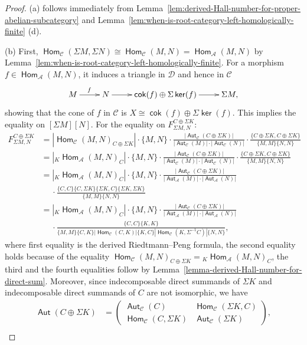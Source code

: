 \documentclass[reqno,12pt,a4paper]{amsart}
\theoremstyle{remark}
\theoremstyle{definition}
\newcommand{\opname}[1]{\operatorname{\mathsf{#1}}}
\newcommand{\cok}{\opname{cok}\nolimits}
\renewcommand{\ker}{\opname{ker}\nolimits}
\newcommand{\Hom}{\opname{Hom}}
\newcommand{\Aut}{\opname{Aut}}
\newcommand{\ca}{{\mathcal A}}
\newcommand{\cc}{{\mathcal C}}
\newcommand{\cd}{{\mathcal D}}
\numberwithin{equation}{section}
\begin{document}
\begin{proof}
(a) follows immediately from Lemma~\ref{lem:derived-Hall-number-for-proper-abelian-subcategory} and Lemma~\ref{lem:when-is-root-category-left-homologically-finite} (d).

(b)
First, $\Hom_\cc(\Sigma M,\Sigma N)\cong\Hom_\cc(M,N)=\Hom_\ca(M,N)$ by Lemma~\ref{lem:when-is-root-category-left-homologically-finite}. For a morphism $f\in\Hom_\ca(M,N)$, it induces a triangle in $\cd$ and hence in $\cc$
\[
\xymatrix{
M\ar[r]^f & N\ar[r] & \cok(f)\oplus \Sigma\ker(f)\ar[r] & \Sigma M,
}
\]
showing that the cone of $f$ in $\cc$ is $X\cong \cok(f)\oplus\Sigma\ker(f)$. This implies the equality on $[\Sigma M][N]$. For the equality on $F_{\Sigma M,N}^{C\oplus \Sigma K}$:
\begin{align*}
F_{\Sigma M,N}^{C\oplus \Sigma K}&=|\Hom_\cc(M,N)_{C\oplus\Sigma K}|\cdot\{M,N\}\cdot \frac{|\Aut_\cc(C\oplus\Sigma K)|}{|\Aut_\cc(M)|\cdot|\Aut_\cc(N)|}\cdot\frac{\{C\oplus\Sigma K,C\oplus\Sigma K\}}{\{M,M\}\{N,N\}}\\
&=|{}_K\Hom_\ca(M,N)_C|\cdot\{M,N\}\cdot \frac{|\Aut_\cc(C\oplus\Sigma K)|}{|\Aut_\cc(M)|\cdot|\Aut_\cc(N)|}\cdot\frac{\{C\oplus\Sigma K,C\oplus\Sigma K\}}{\{M,M\}\{N,N\}}\\
&=|{}_K\Hom_\ca(M,N)_C|\cdot\{M,N\}\cdot \frac{|\Aut_\cc(C\oplus\Sigma K)|}{|\Aut_\ca(M)|\cdot|\Aut_\ca(N)|}\\
&\hspace{15pt}\cdot\frac{\{C,C\}\{C,\Sigma K\}\{\Sigma K,C\}\{\Sigma K,\Sigma K\}}{\{M,M\}\{N,N\}}\\
&=|{}_K\Hom_\ca(M,N)_C|\cdot\{M,N\}\cdot \frac{|\Aut_\cc(C\oplus\Sigma K)|}{|\Aut_\ca(M)|\cdot|\Aut_\ca(N)|}\\
&\hspace{15pt}\cdot\frac{\{C,C\}\{K,K\}}{\{M,M\}\{C,K\}|\Hom_\cc(C,K)|\{K,C\}|\Hom_\cc(K,\Sigma^{-1} C)|\{N,N\}},
\end{align*}
where first equality is the derived Riedtmann--Peng formula, the second equality holds because of the equality $\Hom_\cc(M,N)_{C\oplus \Sigma K}={}_K\Hom_\ca(M,N)_C$,
the third and the fourth equalities follow by Lemma~\ref{lemma-derived-Hall-number-for-direct-sum}.
Moreover, since indecomposable direct summands of $\Sigma K$ and indecomposable direct summands of $C$ are not isomorphic, we have
\begin{align*}
\Aut(C\oplus\Sigma K)&=\begin{pmatrix} \Aut_\cc(C) & \Hom_\cc(\Sigma K,C)\\ \Hom_\cc(C,\Sigma K) & \Aut_\cc(\Sigma K) \end{pmatrix},\\

\end{align*}
\end{proof}
\end{document}

